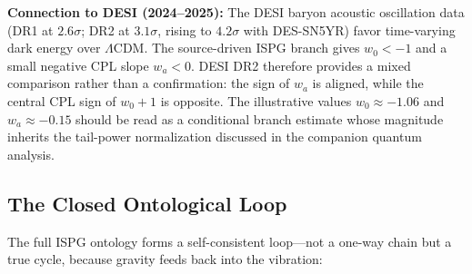 \documentclass[11pt]{article}
\begin{document}
\medskip
\textbf{Connection to DESI (2024--2025):}
The DESI baryon acoustic oscillation data
(DR1 at $2.6\sigma$; DR2 at $3.1\sigma$,
rising to $4.2\sigma$ with DES-SN5YR)
favor time-varying dark energy over
$\Lambda$CDM.  The source-driven ISPG branch gives
$w_0<-1$ and a small negative CPL slope $w_a<0$.
DESI DR2 therefore provides a mixed comparison rather than
a confirmation: the sign of $w_a$ is aligned, while the
central CPL sign of $w_0+1$ is opposite.  The illustrative
values $w_0 \approx -1.06$ and $w_a \approx -0.15$
should be read as a conditional branch estimate whose
magnitude inherits the tail-power normalization discussed
in the companion quantum analysis.

\subsection{The Closed Ontological Loop}
\label{sec:closed_loop}

The full ISPG ontology forms a self-consistent
loop---not a one-way chain but a true cycle,
because gravity feeds back into the vibration:
\end{document}
